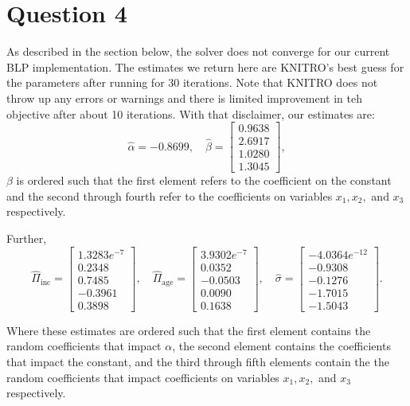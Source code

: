 \documentclass[a4paper,11pt]{article}
\begin{document}
\section*{Question 4}
As described in the section below, the solver does not converge for our current BLP implementation. The estimates we return here are KNITRO's best guess for the parameters after running for 30 iterations. Note that KNITRO does not throw up any errors or warnings and there is limited improvement in teh objective after about 10 iterations. With that disclaimer, our estimates are:
\[
\hat\alpha = -0.8699, \quad
\hat\beta = \left[ \begin{array}{r} 
0.9638 \\ 2.6917 \\ 1.0280 \\ 1.3045
\end{array}\right],
\]
$\beta$ is ordered such that the first element refers to the coefficient on the constant and the second through fourth refer to the coefficients on variables $x_1, x_2,$ and $x_3$ respectively.

\noindent Further,
\[
\hat\Pi_{\mathrm{inc}} = \left[ \begin{array}{r}
1.3283e^{-7} \\ 0.2348 \\ 0.7485 \\ -0.3961 \\ 0.3898
\end{array}\right],
\quad
\hat\Pi_{\mathrm{age}} = \left[ \begin{array}{r}
3.9302e^{-7} \\ 0.0352 \\ -0.0503 \\ 0.0090 \\ 0.1638
\end{array}\right],
\quad
\hat\sigma = \left[ \begin{array}{r}
-4.0364e^{-12} \\ -0.9308 \\ -0.1276 \\ -1.7015 \\ -1.5043
\end{array}\right].
\]

Where these estimates are ordered such that the first element contains the random coefficients that impact $\alpha$, the second element contains the coefficients that impact the constant, and the third through fifth elements contain the the random coefficients that impact coefficients on variables $x_1, x_2,$ and $x_3$ respectively.
\end{document}
